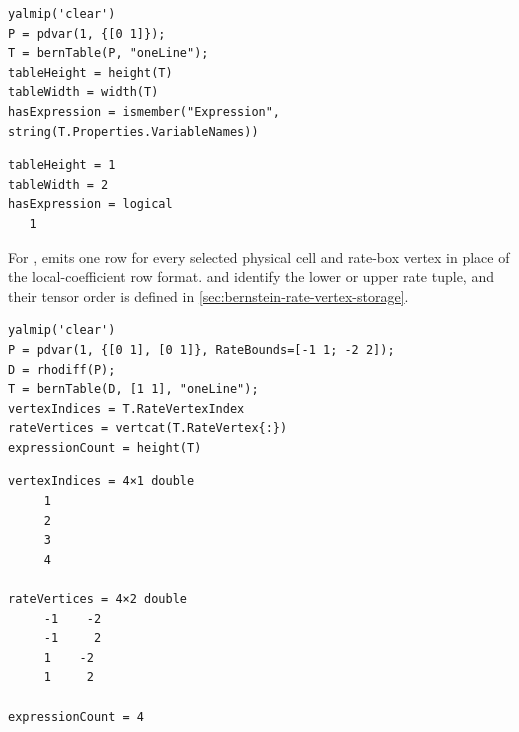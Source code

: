 \begin{center}
\end{center}

\examplehead
\begin{lstlisting}[style=dpmatlab]
yalmip('clear')
P = pdvar(1, {[0 1]});
T = bernTable(P, "oneLine");
tableHeight = height(T)
tableWidth = width(T)
hasExpression = ismember("Expression", string(T.Properties.VariableNames))
\end{lstlisting}

\begin{lstlisting}[style=dpoutput]
tableHeight = 1
tableWidth = 2
hasExpression = logical
   1
\end{lstlisting}

\shortpairspace
For ,  emits one row for every selected physical cell and rate-box vertex in place of the local-coefficient row format.  and  identify the lower or upper rate tuple, and their tensor order is defined in \cref{sec:bernstein-rate-vertex-storage}.

\begin{lstlisting}[style=dpmatlab]
yalmip('clear')
P = pdvar(1, {[0 1], [0 1]}, RateBounds=[-1 1; -2 2]);
D = rhodiff(P);
T = bernTable(D, [1 1], "oneLine");
vertexIndices = T.RateVertexIndex
rateVertices = vertcat(T.RateVertex{:})
expressionCount = height(T)
\end{lstlisting}

\begin{lstlisting}[style=dpoutput]
vertexIndices = 4×1 double
     1
     2
     3
     4

rateVertices = 4×2 double
     -1    -2
     -1     2
     1    -2
     1     2

expressionCount = 4
\end{lstlisting}

